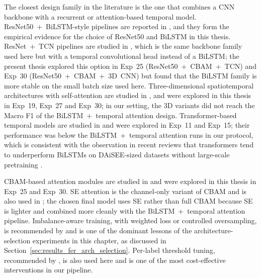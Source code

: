 The closest design family in the literature is the one that combines a CNN backbone with a recurrent or attention-based temporal model. ResNet50~+~BiLSTM-style pipelines are reported in \cite{asaju_adaptive_2022,asaju_affects_2021,tulsani_realtime_2025,shiri_detection_2024}, and they form the empirical evidence for the choice of ResNet50 and BiLSTM in this thesis. ResNet~+~TCN pipelines are studied in \cite{abedi_improving_2021}, which is the same backbone family used here but with a temporal convolutional head instead of a BiLSTM; the present thesis explored this option in Exp~25 (ResNet50~+~CBAM~+~TCN) and Exp~30 (ResNet50~+~CBAM~+~3D~CNN) but found that the BiLSTM family is more stable on the small batch size used here. Three-dimensional spatiotemporal architectures with self-attention are studied in \cite{mehta_three-dimensional_2022,liu_dynamic_nodate}, and were explored in this thesis in Exp~19, Exp~27 and Exp~30; in our setting, the 3D variants did not reach the Macro F1 of the BiLSTM~+~temporal attention design. Transformer-based temporal models are studied in \cite{su_leveraging_2024,liu_dynamic_nodate} and were explored in Exp~11 and Exp~15; their performance was below the BiLSTM~+~temporal attention runs in our protocol, which is consistent with the observation in recent reviews that transformers tend to underperform BiLSTMs on DAiSEE-sized datasets without large-scale pretraining \cite{lek_academic_2023,vistorte_integrating_2024}.

CBAM-based attention modules are studied in \cite{aly_revolutionizing_2025,liu_dynamic_nodate} and were explored in this thesis in Exp~25 and Exp~30. SE attention is the channel-only variant of CBAM and is also used in \cite{aly_revolutionizing_2025}; the chosen final model uses SE rather than full CBAM because SE is lighter and combined more cleanly with the BiLSTM~+~temporal attention pipeline. Imbalance-aware training, with weighted loss or controlled oversampling, is recommended by \cite{santoni_convolutional_2023,abedi_improving_2021,rianto_engagement_2025} and is one of the dominant lessons of the architecture-selection experiments in this chapter, as discussed in Section~\ref{sec:results_fer_arch_selection}. Per-label threshold tuning, recommended by \cite{rianto_engagement_2025,mehta_three-dimensional_2022}, is also used here and is one of the most cost-effective interventions in our pipeline.

